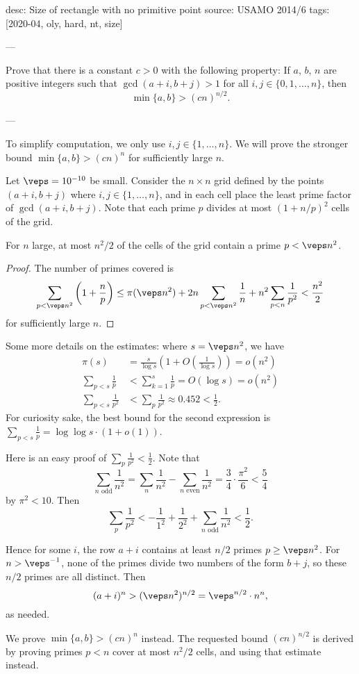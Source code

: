 desc: Size of rectangle with no primitive point
source: USAMO 2014/6
tags: [2020-04, oly, hard, nt, size]

---

Prove that there is a constant $c>0$ with the following property: If $a$, $b$, $n$ are positive integers such that $\gcd(a+i,b+j)>1$ for all $i,j\in\{0,1,\ldots,n\}$, then \[\min\{a,b\}>(cn)^{n/2}.\]

---

To simplify computation, we only use $i,j\in\{1,\ldots,n\}$. We will prove the stronger bound $\min\{a,b\}>(cn)^n$ for sufficiently large $n$.

Let $\veps=10^{-10}$ be small. Consider the $n\times n$ grid defined by the points $(a+i,b+j)$ where $i,j\in\{1,\ldots,n\}$, and in each cell place the least prime factor of $\gcd(a+i,b+j)$. Note that each prime $p$ divides at most $(1+n/p)^2$ cells of the grid.
\begin{claim*}
    For $n$ large, at most $n^2/2$ of the cells of the grid contain a prime $p<\veps n^2$.
\end{claim*}
\begin{proof}
    The number of primes covered is
\[
    \sum_{p<\veps n^2}\left(1+\frac np\right)
    \le\pi(\veps n^2)+2n\sum_{p<\veps n^2}\frac1n+n^2\sum_{p<n}\frac1{p^2}
    <\frac{n^2}2
\]
for sufficiently large $n$.
\end{proof}
\begin{remark}
    Some more details on the estimates: where $s=\veps n^2$, we have
    \begin{align*}
        \pi(s)&=\frac s{\log s}\left(1+O\left(\frac1{\log s}\right)\right)=o\left(n^2\right)\\
        \sum_{p<s}\frac1p&<\sum_{k=1}^s\frac1p=O(\log s)=o(n^2)\\
        \sum_{p<s}\frac1{p^2}&<\sum_p\frac1{p^2}\approx0.452<\frac12.
    \end{align*}
    For curiosity sake, the best bound for the second expression is $\sum_{p<s}\frac1p=\log\log s\cdot(1+o(1))$.
\end{remark}
\begin{remark}
    Here is an easy proof of $\sum_p\frac1{p^2}<\frac12$. Note that \[\sum_{n\text{ odd}}\frac1{n^2}=\sum_n\frac1{n^2}-\sum_{n\text{ even}}\frac1{n^2}=\frac34\cdot\frac{\pi^2}6<\frac54\]
    by $\pi^2<10$. Then \[\sum_p\frac1{p^2}<-\frac1{1^2}+\frac1{2^2}+\sum_{n\text{ odd}}\frac1{n^2}<\frac12.\]
\end{remark}

Hence for some $i$, the row $a+i$ contains at least $n/2$ primes $p\ge \veps n^2$. For $n>\veps^{-1}$, none of the primes divide two numbers of the form $b+j$, so these $n/2$ primes are all distinct. Then \[(a+i)^n>(\veps n^2)^{n/2}=\veps^{n/2}\cdot n^n,\]
as needed.
\begin{remark}
    We prove $\min\{a,b\}>(cn)^n$ instead. The requested bound $(cn)^{n/2}$ is derived by proving primes $p<n$ cover at most $n^2/2$ cells, and using that estimate instead. 
\end{remark}
